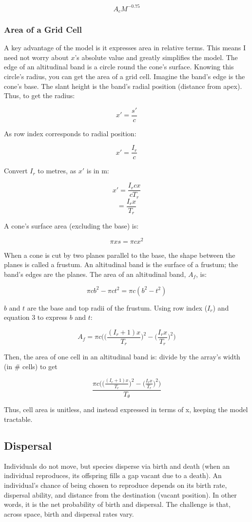 \documentclass[11pt]{article}
\begin{document}
$$A_c M^{-0.75}$$

\subsubsection{Area of a Grid Cell}
A key advantage of the model is it expresses area in relative terms. This means I need not worry about $x$'s absolute value and greatly simplifies the model. The edge of an altitudinal band is a circle round the cone's surface. Knowing this circle's radius, you can get the area of a grid cell. Imagine the band's edge is the cone's base. The slant height is the band's radial position (distance from apex). Thus, to get the radius:

$$x' = \frac{s'}{c}$$

As row index corresponds to radial position:

$$x' = \frac{I_r}{c}$$

Convert $I_r$ to metres, as $x'$ is in m:

$$x' = \frac{I_r cx}{c T_r}$$
$$= \frac{I_r x}{T_r}$$


A cone's surface area (excluding the base) is:

$$\pi xs = \pi cx^2$$

When a cone is cut by two planes parallel to the base, the shape between the planes is called a frustum. An altitudinal band is the surface of a frustum; the band's edges are the planes. The area of an altitudinal band, $A_f$, is:

$$\pi c b^2 - \pi c t^2 = \pi c(b^2 - t^2)$$

$b$ and $t$ are the base and top radii of the frustum. Using row index ($I_r$) and equation 3 to express $b$ and $t$:

$$A_f = \pi c \bigg(\Big(\frac{(I_r + 1)x}{T_r}\Big)^2 - \Big(\frac{I_r x}{T_r}\Big)^2 \bigg)$$

Then, the area of one cell in an altitudinal band is:  
divide by the array's width (in \# cells) to get

$$\frac{\pi c \bigg(\Big(\frac{(I_r + 1)x}{T_r}\Big)^2 - \Big(\frac{I_r x}{T_r}\Big)^2 \bigg)}{T_\theta}$$

Thus, cell area is unitless, and instead expressed in terms of x, keeping the model tractable.

\subsection{Dispersal}
Individuals do not move, but species disperse via birth and death (when an individual reproduces, its offspring fills a gap vacant due to a death). An individual's chance of being chosen to reproduce depends on its birth rate, dispersal ability, and distance from the destination (vacant position). In other words, it is the net probability of birth and dispersal. The challenge is that, across space, birth and dispersal rates vary.
\end{document}
